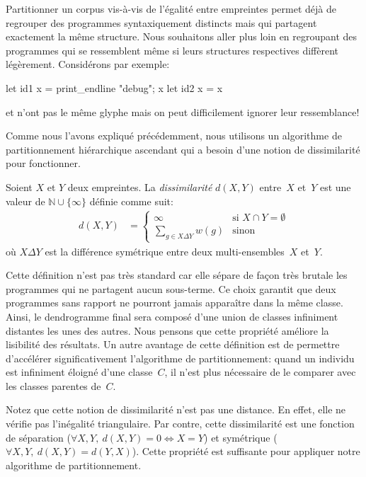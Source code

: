 
Partitionner un corpus vis-à-vis de l'égalité entre empreintes permet
déjà de regrouper des programmes syntaxiquement distincts mais qui
partagent exactement la même structure. Nous souhaitons aller plus loin en regroupant des
programmes qui se ressemblent même si leurs structures respectives
diffèrent légèrement. Considérons par exemple:

\begin{ocaml}
let id1 x = print_endline "debug"; x
let id2 x = x
\end{ocaml}
\noindent {} et  n'ont pas le même glyphe mais
on peut difficilement ignorer leur ressemblance!

Comme nous l'avons expliqué précédemment, nous utilisons un algorithme
de partitionnement hiérarchique ascendant qui a besoin d'une notion
de dissimilarité pour fonctionner.

\begin{defn}
Soient $X$ et $Y$ deux empreintes. La \textit{dissimilarité} $d(X, Y)$ entre~$X$ et~$Y$
est une valeur de $\mathbb{N} \cup \{ \infty \}$ définie comme suit:
\begin{align*}
d (X,Y) &=
\begin{cases}
	\infty & \text{si $X \cap Y = \emptyset$} \\
	\sum\limits_{g \in X \Delta Y} w(g) & \text{sinon}
\end{cases}
\end{align*}
\noindent où $X \Delta Y$ est la différence symétrique entre deux multi-ensembles~$X$ et~$Y$.
\end{defn}

Cette définition n'est pas très standard car elle sépare de façon très
brutale les programmes qui ne partagent aucun sous-terme. Ce choix
garantit que deux programmes sans rapport ne pourront jamais
apparaître dans la même classe. Ainsi, le dendrogramme final sera
composé d'une union de classes infiniment distantes les unes des
autres. Nous pensons que cette propriété améliore la lisibilité des
résultats. Un autre avantage de cette définition est de permettre
d'accélérer significativement l'algorithme de partitionnement: quand
un individu est infiniment éloigné d'une classe~$C$, il n'est plus
nécessaire de le comparer avec les classes parentes de~$C$.

Notez que cette notion de dissimilarité n'est pas une distance. En
effet, elle ne vérifie pas l'inégalité triangulaire. Par contre, cette
dissimilarité est une fonction de séparation ($\forall X,Y,\ d(X,Y) =
0 \iff X = Y$) et symétrique ($\forall X,Y,\ d(X,Y) = d(Y,X)$). Cette
propriété est suffisante pour appliquer notre algorithme de
partitionnement.

